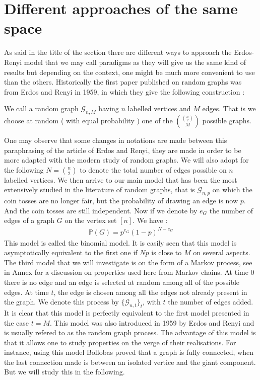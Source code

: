 \section{Different approaches of the same space}
As said in the title of the section there are different ways to approach the Erdos-Renyi model that we may call paradigms as they will give us the same kind of results but depending on the context, one might be much more convenient to use than the others.
\newline
Historically the first paper published on random graphs was from Erdos and Renyi in 1959, in which they give the following construction :
\begin{definition}
We call a random graph $\mathcal{G}_{n, M}$ having $n$ labelled vertices and $M$ edges. That is we choose at random ( with equal probability ) one of the $\binom{\binom{n}{2}}{M}$ possible graphs.
\end{definition}
One may observe that some changes in notations are made between this paraphrasing of the article of Erdos and Renyi, they are made in order to be more adapted with the modern study of random graphs. We will also adopt for the following $N = \binom{n}{2}$ to denote the total number of edges possible on $n$ labelled vertices.
\newline
We then arrive to our main model that has been the most extensively studied in the literature of random graphs, that is $\mathcal{G}_{n, p}$ on which the coin tosses are no longer fair, but the probability of drawing an edge is now $p$. And the coin tosses are still independent. Now if we denote by $e_G$ the number of edges of a graph $G$ on the vertex set $[n]$. We have :
\begin{align}
	\mathbb{P}(G) = p^{e_G}(1-p)^{N-e_G}
\end{align}
This model is called the binomial model. It is easily seen that this model is asymptotically equivalent to the first one if $Np$ is close to $M$ on several aspects.
\newline
The third model that we will investigate is on the form of a Markov process, see in Annex for a discussion on properties used here from Markov chains. 
At time 0 there is no edge and an edge is selected at random among all of the possible edges. 
At time $t$, the edge is chosen among all the edges not already present in the graph. We denote this process by $\{\mathcal{G}_{n, t}\}_t$, with $t$ the number of edges added. 
It is clear that this model is perfectly equivalent to the first model presented in the case $t = M$. This model was also introduced in 1959 by Erdos and Renyi and is usually refered to as the random graph process.
The advantage of this model is that it allows one to study properties on the verge of their realisations.
For instance, using this model Bollobas proved that a graph is fully connected, when the last connection made is between an isolated vertice and the giant component. But we will study this in the following.




